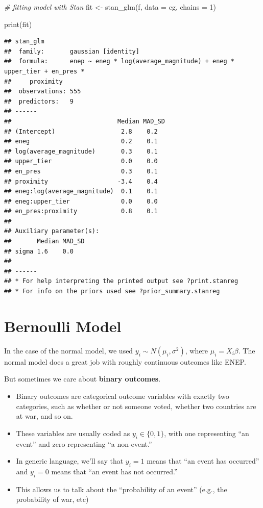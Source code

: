 \documentclass[
]{book}
\newenvironment{Shaded}{\begin{snugshade}}{\end{snugshade}}
\newcommand{\AttributeTok}[1]{\textcolor[rgb]{0.77,0.63,0.00}{#1}}
\newcommand{\CommentTok}[1]{\textcolor[rgb]{0.56,0.35,0.01}{\textit{#1}}}
\newcommand{\DecValTok}[1]{\textcolor[rgb]{0.00,0.00,0.81}{#1}}
\newcommand{\FunctionTok}[1]{\textcolor[rgb]{0.00,0.00,0.00}{#1}}
\newcommand{\NormalTok}[1]{#1}
\newcommand{\OtherTok}[1]{\textcolor[rgb]{0.56,0.35,0.01}{#1}}
\providecommand{\tightlist}{%
  \setlength{\itemsep}{0pt}\setlength{\parskip}{0pt}}
\begin{document}
\begin{Shaded}
\begin{Highlighting}[]
\CommentTok{\# fitting model with Stan}
\NormalTok{fit }\OtherTok{\textless{}{-}} \FunctionTok{stan\_glm}\NormalTok{(f, }\AttributeTok{data =}\NormalTok{ cg, }\AttributeTok{chains =} \DecValTok{1}\NormalTok{)}
\end{Highlighting}
\end{Shaded}

\begin{Shaded}
\begin{Highlighting}[]
\FunctionTok{print}\NormalTok{(fit)}
\end{Highlighting}
\end{Shaded}

\begin{verbatim}
## stan_glm
##  family:       gaussian [identity]
##  formula:      enep ~ eneg * log(average_magnitude) + eneg * upper_tier + en_pres * 
##     proximity
##  observations: 555
##  predictors:   9
## ------
##                             Median MAD_SD
## (Intercept)                  2.8    0.2  
## eneg                         0.2    0.1  
## log(average_magnitude)       0.3    0.1  
## upper_tier                   0.0    0.0  
## en_pres                      0.3    0.1  
## proximity                   -3.4    0.4  
## eneg:log(average_magnitude)  0.1    0.1  
## eneg:upper_tier              0.0    0.0  
## en_pres:proximity            0.8    0.1  
## 
## Auxiliary parameter(s):
##       Median MAD_SD
## sigma 1.6    0.0   
## 
## ------
## * For help interpreting the printed output see ?print.stanreg
## * For info on the priors used see ?prior_summary.stanreg
\end{verbatim}

\hypertarget{bernoulli-model}{%
\section{Bernoulli Model}\label{bernoulli-model}}

In the case of the normal model, we used \(y_i \sim N(\mu_i, \sigma^2)\), where \(\mu_i = X_i\beta\). The normal model does a great job with roughly continuous outcomes like ENEP.

But sometimes we care about \textbf{binary outcomes}.

\begin{itemize}
\tightlist
\item
  Binary outcomes are categorical outcome variables with exactly two categories, such as whether or not someone voted, whether two countries are at war, and so on.
\item
  These variables are usually coded as \(y_i \in \{0, 1\}\), with one representing ``an event'' and zero representing ``a non-event.''
\item
  In generic language, we'll say that \(y_i = 1\) means that ``an event has occurred'' and \(y_i = 0\) means that ``an event has not occurred.''
\item
  This allows us to talk about the ``probability of an event'' (e.g., the probability of war, etc)
\end{itemize}
\end{document}
